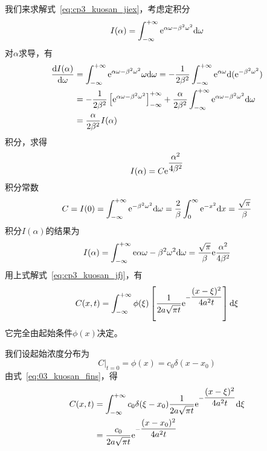 我们来求解式~\ref{eq:cp3_kuosan_jiex}，考虑定积分
\begin{equation*}
 I(\alpha)=\int_{-\infty}^{+\infty}\mathrm{e}^{\alpha\omega-\beta^2\omega^2}\mathrm{d}\omega
\end{equation*}
对$\alpha$求导，有
\begin{equation*}
 \begin{aligned}
 \dfrac{\mathrm{d} I(\alpha)}{\mathrm{d}\omega} & = \int_{-\infty}^{+\infty}\mathrm{e}^{\alpha\omega-\beta^2\omega^2}\omega\mathrm{d}\omega
 =-\dfrac{1}{2\beta^2}\int_{-\infty}^{+\infty}\mathrm{e}^{\alpha\omega}\mathrm{d}(\mathrm{e}^{-\beta^2\omega^2})\\
 &=-\dfrac{1}{2\beta^2}\left[\mathrm{e}^{\alpha\omega-\beta^2\omega^2}\right]^{+\infty}_{-\infty}+\dfrac{\alpha}{2\beta^2}
 \int^{+\infty}_{-\infty}\mathrm{e}^{\alpha\omega-\beta^2\omega^2}\mathrm{d}\omega\\
 &=\dfrac{\alpha}{2\beta^2}I(\alpha)
 \end{aligned}
\end{equation*}
积分，求得
\begin{equation}
 I(\alpha)=C\mathrm{e}^{\dfrac{\alpha^2}{4\beta^2}}
\end{equation}
积分常数
\begin{equation*}
 C=I(0)=\int_{-\infty}^{+\infty}\mathrm{e}^{-\beta^2\omega^2}\mathrm{d}\omega
       =\dfrac{2}{\beta}\int_0^{\infty}\mathrm{e}^{-x^2}\mathrm{d} x=\dfrac{\sqrt{\pi}}{\beta}
\end{equation*}
积分$I(\alpha)$的结果为
\begin{equation}\label{eq:03_kuosan_gs}
 I(\alpha)=\int_{-\infty}^{+\infty}\mathrm{e}{\alpha\omega-\beta^2\omega^2}\mathrm{d}\omega
          =\dfrac{\sqrt{\pi}}{\beta}\mathrm{e}{\dfrac{\alpha^2}{4\beta^2}}
\end{equation}
用上式解式~\ref{eq:cp3_kuosan_jfj}，有
\begin{equation}\label{eq:03_kuosan_fins}
 C(x,t)=\int_{-\infty}^{+\infty}\phi(\xi)\left[\dfrac{1}{2a\sqrt{\pi t}}\mathrm{e}^{-\dfrac{(x-\xi)^2}{4a^2t}}\right]\mathrm{d}\xi
\end{equation}
它完全由起始条件$\phi(x)$决定。\par
我们设起始浓度分布为
\begin{equation*}
 \left.C\right|_{t=0}=\phi(x)=c_0\delta(x-x_0)
\end{equation*}
由式~\ref{eq:03_kuosan_fins}，得
\begin{equation}
 \begin{split}
  C(x,t)&=\int_{-\infty}^{+\infty}c_0\delta(\xi-x_0)\dfrac{1}{2a\sqrt{\pi t}}\mathrm{e}^{-\dfrac{(x-\xi)^2}{4a^2t}}\mathrm{d}\xi \\
        &=\dfrac{c_0}{2a\sqrt{\pi t}}\mathrm{e}^{-\dfrac{(x-x_0)^2}{4a^2t}}
 \end{split}
\end{equation}
